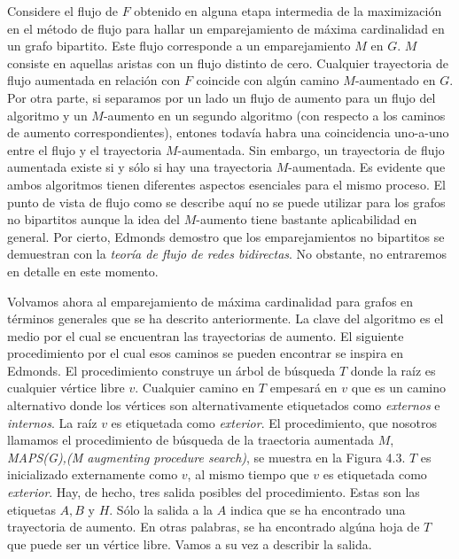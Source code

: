 \documentclass[10pt,a5paper]{book}
\begin{document}
Considere el flujo de $F$ obtenido en alguna etapa intermedia de la maximización en el método de flujo para hallar un emparejamiento de máxima cardinalidad en un grafo bipartito. Este flujo corresponde a un emparejamiento $M$ en $G$. $M$ consiste en aquellas aristas con un flujo distinto de cero. Cualquier trayectoria de flujo aumentada en relación con $F$ coincide con algún camino $M$-aumentado en $G$. Por otra parte, si separamos por un lado un flujo de aumento para un flujo del algoritmo y un $M$-aumento en un segundo algoritmo (con respecto a los caminos de aumento correspondientes), entones todavía habra una coincidencia uno-a-uno entre el flujo y el trayectoria $M$-aumentada. Sin embargo, un trayectoria de flujo aumentada existe si y sólo si hay una trayectoria $M$-aumentada. Es evidente que ambos algoritmos tienen diferentes aspectos esenciales para el mismo proceso. El punto de vista de flujo como se describe aquí no se puede utilizar para los grafos no bipartitos aunque la idea del $M$-aumento tiene bastante aplicabilidad en general. Por cierto, Edmonds \cite{k} demostro que los emparejamientos no bipartitos se demuestran con la \emph{teoría de flujo de redes bidirectas}. No obstante, no entraremos en detalle en este momento.

Volvamos ahora al emparejamiento de máxima cardinalidad para grafos en términos generales que se ha descrito anteriormente. La clave del algoritmo es el medio por el cual se encuentran las trayectorias de aumento. El siguiente procedimiento por el cual esos caminos se pueden encontrar se inspira en Edmonds\cite{l}. El procedimiento construye un árbol de búsqueda $T$ donde la raíz es cualquier vértice libre $v$. Cualquier camino en $T$ empesará en $v$ que es un camino alternativo donde los vértices son alternativamente etiquetados como \emph{externos} e \emph{internos}. La raíz $v$ es etiquetada como \emph{exterior}. El procedimiento, que nosotros llamamos el procedimiento de búsqueda de la traectoria aumentada $M$, \emph{MAPS(G),(M augmenting procedure search)}, se muestra en la Figura 4.3. $T$ es inicializado externamente como $v$, al mismo tiempo que $v$ es etiquetada como \emph{exterior}. Hay, de hecho, tres salida posibles del procedimiento. Estas son las etiquetas $A, B$ y $H$. Sólo la salida a la $A$ indica que se ha encontrado una trayectoria de aumento. En otras palabras, se ha encontrado algúna hoja de $T$ que puede ser un vértice libre. Vamos a su vez a describir la salida.
\end{document}
